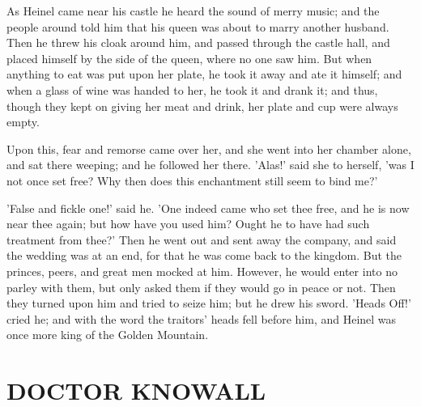 \documentclass[12pt]{book}
\begin{document}
As Heinel came near his castle he heard the sound of merry music; and
the people around told him that his queen was about to marry another
husband. Then he threw his cloak around him, and passed through the
castle hall, and placed himself by the side of the queen, where no one
saw him. But when anything to eat was put upon her plate, he took it
away and ate it himself; and when a glass of wine was handed to her,
he took it and drank it; and thus, though they kept on giving her meat
and drink, her plate and cup were always empty.

Upon this, fear and remorse came over her, and she went into her
chamber alone, and sat there weeping; and he followed her there.
'Alas!' said she to herself, 'was I not once set free? Why then does
this enchantment still seem to bind me?'

'False and fickle one!' said he. 'One indeed came who set thee free,
and he is now near thee again; but how have you used him? Ought he to
have had such treatment from thee?' Then he went out and sent away the
company, and said the wedding was at an end, for that he was come back
to the kingdom. But the princes, peers, and great men mocked at him.
However, he would enter into no parley with them, but only asked them
if they would go in peace or not. Then they turned upon him and tried
to seize him; but he drew his sword. 'Heads Off!' cried he; and with
the word the traitors' heads fell before him, and Heinel was once more
king of the Golden Mountain.



\chapter{DOCTOR KNOWALL}
\end{document}
